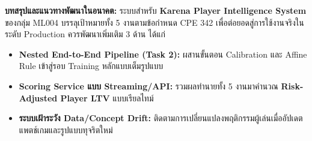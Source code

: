 \documentclass[11pt,a4paper]{article}
\begin{document}
\textbf{บทสรุปและแนวทางพัฒนาในอนาคต:} ระบบสำหรับ \textbf{Karena Player Intelligence System} ของกลุ่ม ML004 บรรลุเป้าหมายทั้ง 5 งานตามข้อกำหนด CPE 342 เพื่อต่อยอดสู่การใช้งานจริงในระดับ Production ควรพัฒนาเพิ่มเติม 3 ด้าน ได้แก่
\begin{itemize}
    \item \textbf{Nested End-to-End Pipeline (Task 2):} ผสานขั้นตอน Calibration และ Affine Rule เข้าสู่รอบ Training หลักแบบเต็มรูปแบบ
    \item \textbf{Scoring Service แบบ Streaming/API:} รวมผลทำนายทั้ง 5 งานมาคำนวณ \textbf{Risk-Adjusted Player LTV} แบบเรียลไทม์
    \item \textbf{ระบบเฝ้าระวัง Data/Concept Drift:} ติดตามการเปลี่ยนแปลงพฤติกรรมผู้เล่นเมื่ออัปเดตแพตช์เกมและรูปแบบทุจริตใหม่
\end{itemize}
\end{document}
